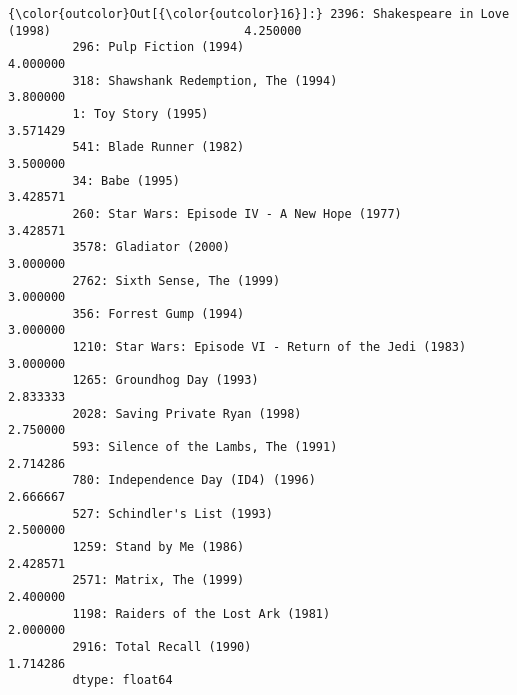\documentclass[11pt]{article}
\begin{document}
\begin{Verbatim}[commandchars=\\\{\}]
{\color{outcolor}Out[{\color{outcolor}16}]:} 2396: Shakespeare in Love (1998)                           4.250000
         296: Pulp Fiction (1994)                                   4.000000
         318: Shawshank Redemption, The (1994)                      3.800000
         1: Toy Story (1995)                                        3.571429
         541: Blade Runner (1982)                                   3.500000
         34: Babe (1995)                                            3.428571
         260: Star Wars: Episode IV - A New Hope (1977)             3.428571
         3578: Gladiator (2000)                                     3.000000
         2762: Sixth Sense, The (1999)                              3.000000
         356: Forrest Gump (1994)                                   3.000000
         1210: Star Wars: Episode VI - Return of the Jedi (1983)    3.000000
         1265: Groundhog Day (1993)                                 2.833333
         2028: Saving Private Ryan (1998)                           2.750000
         593: Silence of the Lambs, The (1991)                      2.714286
         780: Independence Day (ID4) (1996)                         2.666667
         527: Schindler's List (1993)                               2.500000
         1259: Stand by Me (1986)                                   2.428571
         2571: Matrix, The (1999)                                   2.400000
         1198: Raiders of the Lost Ark (1981)                       2.000000
         2916: Total Recall (1990)                                  1.714286
         dtype: float64
\end{Verbatim}
            
\end{document}
